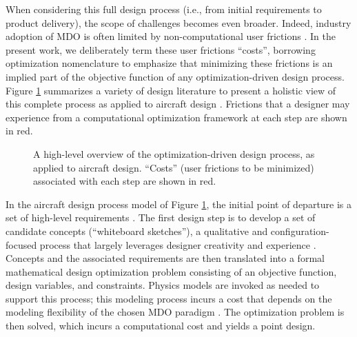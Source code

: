 When considering this full design process (i.e., from initial requirements to product delivery), the scope of challenges becomes even broader. Indeed, industry adoption of MDO is often limited by non-computational user frictions \cite{salas_framework_1998, gpkit, martins_engineering_2021}. In the present work, we deliberately term these user frictions ``costs'', borrowing optimization nomenclature to emphasize that minimizing these frictions is an implied part of the objective function of any optimization-driven design process. Figure \ref{fig:birds_eye_view} summarizes a variety of design literature to present a holistic view of this complete process as applied to aircraft design \cite{torenbeek_advanced_2013, martins_engineering_2021, yang_observations_2009, torenbeek_synthesis_1976, roskam_airplane_1989, nicolai_fundamentals_2010, salas_framework_1998}. Frictions that a designer may experience from a computational optimization framework at each step are shown in \textcolor[HTML]{BB5045}{red}.

\begin{figure}[h]
    \centering
    \caption{A high-level overview of the optimization-driven design process, as applied to aircraft design. ``Costs'' (user frictions to be minimized) associated with each step are shown in \textcolor[HTML]{BB5045}{red}.}
    \label{fig:birds_eye_view}
\end{figure}

In the aircraft design process model of Figure \ref{fig:birds_eye_view}, the initial point of departure is a set of high-level requirements \cite{torenbeek_synthesis_1976, torenbeek_advanced_2013}. The first design step is to develop a set of candidate concepts (``whiteboard sketches''), a qualitative and configuration-focused process that largely leverages designer creativity and experience \cite{yang_observations_2009, roskam_airplane_1989}. Concepts and the associated requirements are then translated into a formal mathematical design optimization problem consisting of an objective function, design variables, and constraints. Physics models are invoked as needed to support this process; this modeling process incurs a cost that depends on the modeling flexibility of the chosen MDO paradigm \cite{sharpe_aerosandbox_2021}. The optimization problem is then solved, which incurs a computational cost and yields a point design.

